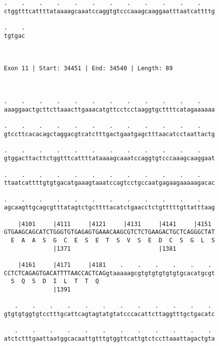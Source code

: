 \documentclass{article}
\begin{document}
\begin{Verbatim}
.    .    .    .    .    .    .    .    .    .    .    .    
ctggtttcattttataaaagcaaatccaggtgtcccaaagcaaggaatttaatcattttg
                                                            
.    .
tgtgac
      
      
 
Exon 11 | Start: 34451 | End: 34540 | Length: 89



.    .    .    .    .    .    .    .    .    .    .    .    
aaaggaactgcttcttaaacttgaaacatgttcctcctaaggtgcttttcatagaaaaaa
                                                            
.    .    .    .    .    .    .    .    .    .    .    .    
gtccttcacacagctaggacgtcatctttgactgaatgagctttaacatcctaattactg
                                                            
.    .    .    .    .    .    .    .    .    .    .    .    
gtggacttacttctggtttcattttataaaagcaaatccaggtgtcccaaagcaaggaat
                                                            
.    .    .    .    .    .    .    .    .    .    .    .    
ttaatcattttgtgtgacatgaaagtaaatccagtcctgccaatgagaagaaaaagacac
                                                            
.    .    .    .    .    .    .    .    .    .    .    .    
agcaagttgcagcgtttatagtctgcttttacatctgaacctctgtttttgttatttaag
                                                            
    |4101     |4111     |4121     |4131     |4141     |4151 
GTGAAGCAGCATCTGGGTGTGAGAGTGAAACAAGCGTCTCTGAAGACTGCTCAGGGCTAT
  E  A  A  S  G  C  E  S  E  T  S  V  S  E  D  C  S  G  L  S
              |1371                         |1381           
  
    |4161     |4171     |4181    .    .    .    .    .    . 
CCTCTCAGAGTGACATTTTAACCACTCAGgtaaaaagcgtgtgtgtgtgtgcacatgcgt
  S  Q  S  D  I  L  T  T  Q                                 
              |1391                                         
  
   .    .    .    .    .    .    .    .    .    .    .    . 
gtgtgtggtgtcctttgcattcagtagtatgtatcccacattcttaggtttgctgacatc
                                                            
   .    .    .    .    .    .    .    .    .    .    .    . 
atctctttgaattaatggcacaattgtttgtggttcattgtctccttaaattagactgta
                                                            

\end{Verbatim}
\end{document}
